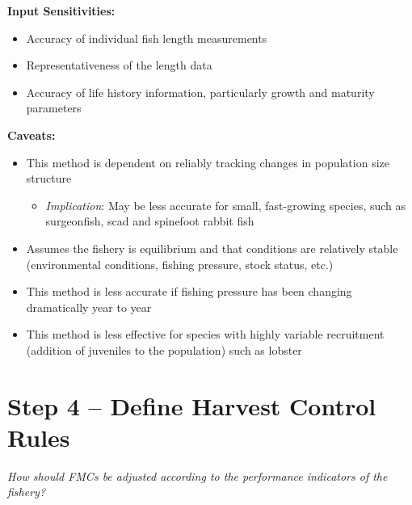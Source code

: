 \documentclass[]{book}
\providecommand{\tightlist}{%
  \setlength{\itemsep}{0pt}\setlength{\parskip}{0pt}}
\begin{document}
\textbf{Input Sensitivities: }

\begin{itemize}
\item
  Accuracy of individual fish length measurements
\item
  Representativeness of the length data
\item
  Accuracy of life history information, particularly growth and maturity
  parameters
\end{itemize}

\textbf{Caveats:}

\begin{itemize}
\item
  This method is dependent on reliably tracking changes in population
  size structure

  \begin{itemize}
  \tightlist
  \item
    \emph{Implication}: May be less accurate for small, fast-growing
    species, such as surgeonfish, scad and spinefoot rabbit fish
  \end{itemize}
\item
  Assumes the fishery is equilibrium and that conditions are relatively
  stable (environmental conditions, fishing pressure, stock status,
  etc.)
\item
  This method is less accurate if fishing pressure has been changing
  dramatically year to year
\item
  This method is less effective for species with highly variable
  recruitment (addition of juveniles to the population) such as lobster
\end{itemize}

\hypertarget{Step4}{\chapter{Step 4 -- Define Harvest Control
Rules}\label{Step4}}

\emph{How should FMCs be adjusted according to the performance
indicators of the fishery?}
\end{document}
